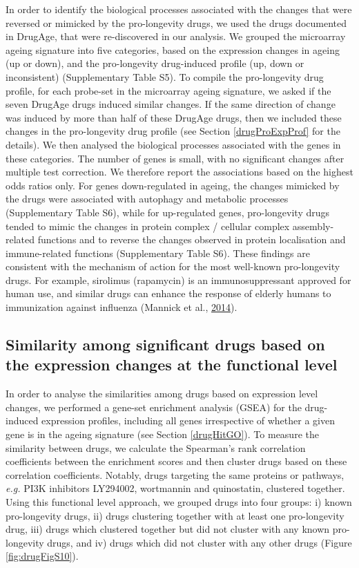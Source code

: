 \documentclass[12pt,twoside]{unicam}
\begin{document}
In order to identify the biological processes associated with the changes that were reversed or mimicked by the pro-longevity drugs, we used the drugs documented in DrugAge, that were re-discovered in our analysis. We grouped the microarray ageing signature into five categories, based on the expression changes in ageing (up or down), and the pro-longevity drug-induced profile (up, down or inconsistent) (Supplementary Table S5). To compile the pro-longevity drug profile, for each probe-set in the microarray ageing signature, we asked if the seven DrugAge drugs induced similar changes. If the same direction of change was induced by more than half of these DrugAge drugs, then we included these changes in the pro-longevity drug profile (see Section \ref{drugProExpProf} for the details). We then analysed the biological processes associated with the genes in these categories. The number of genes is small, with no significant changes after multiple test correction. We therefore report the associations based on the highest odds ratios only. For genes down-regulated in ageing, the changes mimicked by the drugs were associated with autophagy and metabolic processes (Supplementary Table S6), while for up-regulated genes, pro-longevity drugs tended to mimic the changes in protein complex / cellular complex assembly-related functions and to reverse the changes observed in protein localisation and immune-related functions (Supplementary Table S6). These findings are consistent with the mechanism of action for the most well-known pro-longevity drugs. For example, sirolimus (rapamycin) is an immunosuppressant approved for human use, and similar drugs can enhance the response of elderly humans to immunization against influenza (Mannick et al., \protect\hyperlink{ref-Mannick2014}{2014}).

\hypertarget{similarity-among-significant-drugs-based-on-the-expression-changes-at-the-functional-level}{%
\subsection{Similarity among significant drugs based on the expression changes at the functional level}\label{similarity-among-significant-drugs-based-on-the-expression-changes-at-the-functional-level}}

In order to analyse the similarities among drugs based on expression level changes, we performed a gene-set enrichment analysis (GSEA) for the drug-induced expression profiles, including all genes irrespective of whether a given gene is in the ageing signature (see Section \ref{drugHitGO}). To measure the similarity between drugs, we calculate the Spearman's rank correlation coefficients between the enrichment scores and then cluster drugs based on these correlation coefficients. Notably, drugs targeting the same proteins or pathways, \emph{e.g.} PI3K inhibitors LY294002, wortmannin and quinostatin, clustered together. Using this functional level approach, we grouped drugs into four groups: i) known pro-longevity drugs, ii) drugs clustering together with at least one pro-longevity drug, iii) drugs which clustered together but did not cluster with any known pro-longevity drugs, and iv) drugs which did not cluster with any other drugs (Figure \ref{fig:drugFigS10}).
\end{document}
